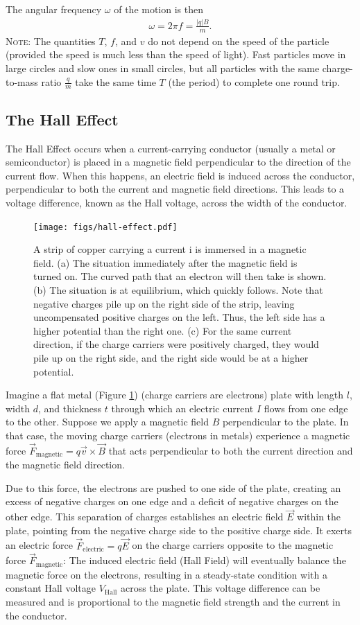\documentclass[12pt,b4paper]{article}
\begin{document}
The angular frequency $\omega$ of the motion is then
\begin{align}
    \omega=2\pi f=\frac{|q|B}{m}.
\end{align}
\textsc{Note}: The quantities $T$, $f$, and $v$ do not depend on the speed of the particle (provided the speed is much less than the speed of light). Fast particles move in large circles and slow ones in small circles, but all particles with the same charge-to-mass ratio $\displaystyle\frac{q}{m}$ take the same time $T$ (the period) to complete one round trip.
\subsection{The Hall Effect}
The Hall Effect occurs when a current-carrying conductor (usually a metal or semiconductor) is placed in a magnetic field perpendicular to the direction of the current flow. When this happens, an electric field is induced across the conductor, perpendicular to both the current and magnetic field directions. This leads to a voltage difference, known as the Hall voltage, across the width of the conductor.
\begin{figure}[H]
    \centering
    \texttt{[image: figs/hall-effect.pdf]}
    \caption{A strip of copper carrying a current i is immersed in a magnetic field. (a) The situation immediately after the magnetic field is turned on. The curved path that an electron will then take is shown. (b) The situation is at equilibrium, which quickly follows. Note that negative charges pile up on the right side of the strip, leaving uncompensated positive charges on the left. Thus, the left side has a higher potential than the right one. (c) For the same current direction, if the charge carriers were positively charged, they would pile up on the right side, and the right side would be at a higher potential.}
    \label{fig:hall-effect}
\end{figure}
Imagine a flat metal (Figure \ref{fig:hall-effect}) (charge carriers are electrons) plate with length $l$, width $d$, and thickness $t$ through which an electric current $I$ flows from one edge to the other. Suppose we apply a magnetic field $B$ perpendicular to the plate. In that case, the moving charge carriers (electrons in metals) experience a magnetic force $\vec{F}_\text{magnetic}=q\vec{v}\times\vec{B}$ that acts perpendicular to both the current direction and the magnetic field direction. 

Due to this force, the electrons are pushed to one side of the plate, creating an excess of negative charges on one edge and a deficit of negative charges on the other edge. This separation of charges establishes an electric field $\vec{E}$ within the plate, pointing from the negative charge side to the positive charge side. It exerts an electric force $\vec{F}_\text{electric}=q\vec{E}$ on the charge carriers opposite to the magnetic force $\vec{F}_\text{magnetic}$: The induced electric field (Hall Field) will eventually balance the magnetic force on the electrons, resulting in a steady-state condition with a constant Hall voltage $V_\text{Hall}$ across the plate. This voltage difference can be measured and is proportional to the magnetic field strength and the current in the conductor.
\end{document}
